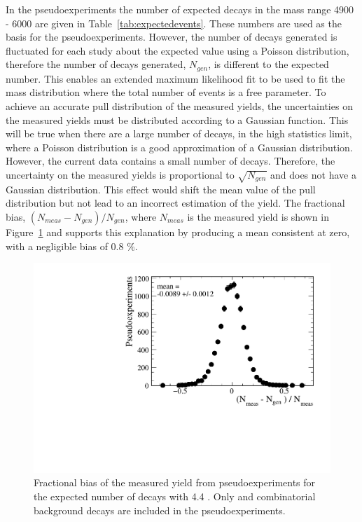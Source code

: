 In the pseudoexperiments the number of expected decays in the mass range 4900 - 6000 \mevcc are given in Table~\ref{tab:expectedevents}. These numbers are used as the basis for the pseudoexperiments. However, the number of decays generated is fluctuated for each study about the expected value using a Poisson distribution, therefore the number of decays generated, $N_{gen}$, is different to the expected number. This enables an extended maximum likelihood fit to be used to fit the mass distribution where the total number of events is a free parameter. To achieve an accurate pull distribution of the measured \bsmumu yields, the uncertainties on the measured yields must be distributed according to a Gaussian function. This will be true when there are a large number of \bsmumu decays, in the high statistics limit, where a Poisson distribution is a good approximation of a Gaussian distribution. However, the current data contains a small number of \bsmumu decays. Therefore, the uncertainty on the measured yields is proportional to $\sqrt{N_{gen}}$ and does not have a Gaussian distribution. This effect would shift the mean value of the pull distribution but not lead to an incorrect estimation of the \bsmumu yield. The fractional bias, $(N_{meas} - N_{gen})/N_{gen}$, where $N_{meas}$ is the measured \bsmumu yield is shown in Figure~\ref{fig:FracBias} and supports this explanation by producing a mean consistent at zero, with a negligible bias of 0.8 $\%$. 

\begin{figure}[htbp]
    \centering
        \includegraphics[width=0.6 \textwidth]{./Figs/LifetimeSystematics/Fractional_bias_Bsmumu_yield_CKM.pdf}
    \caption{Fractional bias of the measured \bsmumu yield from pseudoexperiments for the expected number of decays with 4.4 \fb. Only \bsmumu and combinatorial background decays are included in the pseudoexperiments.}
    \label{fig:FracBias}
\end{figure}


